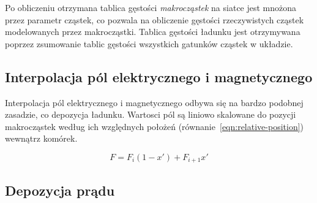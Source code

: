 
Po obliczeniu otrzymana tablica gęstości \emph{makrocząstek} na
siatce jest mnożona przez parametr  cząstek, co pozwala na
obliczenie gęstości rzeczywistych cząstek modelowanych przez makrocząstki.
Tablica gęstości ładunku jest otrzymywana poprzez zsumowanie tablic gęstości
wszystkich gatunków cząstek w układzie.


%
%
%



\subsection{Interpolacja pól elektrycznego i magnetycznego}

Interpolacja pól elektrycznego i magnetycznego odbywa się na bardzo podobnej
zasadzie, co depozycja ładunku. Wartosci pól są liniowo skalowane do pozycji
makrocząstek według ich względnych położeń (równanie~\ref{eqn:relative-position}) wewnątrz komórek.

\begin{equation}
    F = F_i (1-x') + F_{i+1} x'
    \label{eqn:field-interpolation}
\end{equation}

\subsection{Depozycja prądu} %

